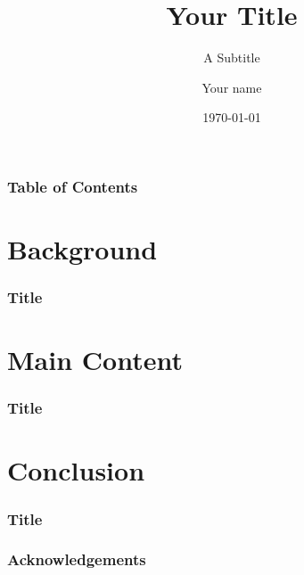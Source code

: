 \documentclass[aspectratio=169]{beamer}
\title{Your Title}
\subtitle{A Subtitle}
\author{Your name}
\institute{Montana State University\\ Your Department}
\date{\today}
\begin{document}
\begin{frame}
	\titlepage



\end{frame}
\begin{frame}
	\frametitle{Table of Contents}
	\tableofcontents



\end{frame}


\section{Background}
\begin{frame}
	\frametitle{Title}



\end{frame}


\section{Main Content}
\begin{frame}
	\frametitle{Title}



\end{frame}


\section{Conclusion}
\begin{frame}
	\frametitle{Title}



\end{frame}


\begin{frame}
	\frametitle{Acknowledgements}



\end{frame}
\end{document}
